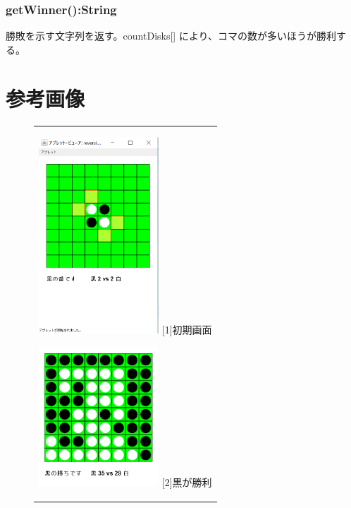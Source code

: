 \documentclass[10.5pt, a4paper]{jsarticle}
\begin{document}
\subsubsection*{getWinner():String}

勝敗を示す文字列を返す。countDisks[] により、コマの数が多いほうが勝利する。

\newpage

\section{参考画像}

\begin{figure}[htbp]
  \begin{center}
    \begin{tabular}{c}

      \begin{minipage}{0.33\hsize}
        \begin{center}
          \includegraphics[clip, width=4.5cm]{./image/img01.png}
          \hspace{1.6cm} [1]初期画面
        \end{center}
      \end{minipage}

      \begin{minipage}{0.33\hsize}
        \begin{center}
          \includegraphics[clip, width=4.5cm]{./image/img02.png}
          \hspace{1.6cm} [2]黒が勝利
        \end{center}
      \end{minipage}


\end{tabular}
\end{center}
\end{figure}
\end{document}
